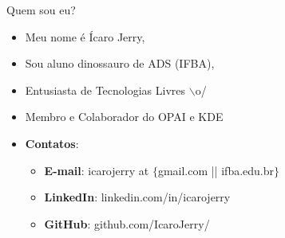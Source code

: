 \begin{frame}{Quem sou eu?}
    \begin{itemize}
        \item Meu nome é Ícaro Jerry,
        \item Sou aluno dinossauro de ADS (IFBA),
        \item Entusiasta de Tecnologias Livres $\backslash$o/
        \item Membro e Colaborador do OPAI e KDE
        \item \textbf{Contatos}:        
        \begin{itemize}
            \item \textbf{E-mail}: icarojerry at $\{$gmail.com || ifba.edu.br$\}$
            \item \textbf{LinkedIn}: linkedin.com/in/icarojerry
            \item \textbf{GitHub}: github.com/IcaroJerry/
        \end{itemize}
    \end{itemize}
\end{frame}
%
